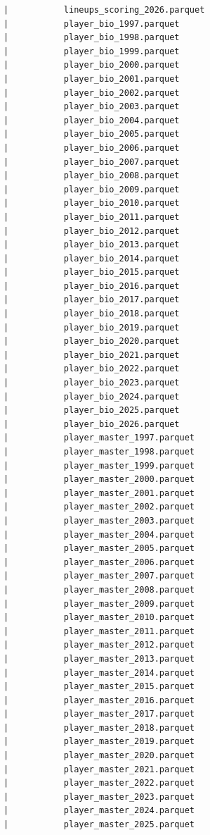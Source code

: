 \begin{lstlisting}
      |           lineups_scoring_2026.parquet
      |           player_bio_1997.parquet
      |           player_bio_1998.parquet
      |           player_bio_1999.parquet
      |           player_bio_2000.parquet
      |           player_bio_2001.parquet
      |           player_bio_2002.parquet
      |           player_bio_2003.parquet
      |           player_bio_2004.parquet
      |           player_bio_2005.parquet
      |           player_bio_2006.parquet
      |           player_bio_2007.parquet
      |           player_bio_2008.parquet
      |           player_bio_2009.parquet
      |           player_bio_2010.parquet
      |           player_bio_2011.parquet
      |           player_bio_2012.parquet
      |           player_bio_2013.parquet
      |           player_bio_2014.parquet
      |           player_bio_2015.parquet
      |           player_bio_2016.parquet
      |           player_bio_2017.parquet
      |           player_bio_2018.parquet
      |           player_bio_2019.parquet
      |           player_bio_2020.parquet
      |           player_bio_2021.parquet
      |           player_bio_2022.parquet
      |           player_bio_2023.parquet
      |           player_bio_2024.parquet
      |           player_bio_2025.parquet
      |           player_bio_2026.parquet
      |           player_master_1997.parquet
      |           player_master_1998.parquet
      |           player_master_1999.parquet
      |           player_master_2000.parquet
      |           player_master_2001.parquet
      |           player_master_2002.parquet
      |           player_master_2003.parquet
      |           player_master_2004.parquet
      |           player_master_2005.parquet
      |           player_master_2006.parquet
      |           player_master_2007.parquet
      |           player_master_2008.parquet
      |           player_master_2009.parquet
      |           player_master_2010.parquet
      |           player_master_2011.parquet
      |           player_master_2012.parquet
      |           player_master_2013.parquet
      |           player_master_2014.parquet
      |           player_master_2015.parquet
      |           player_master_2016.parquet
      |           player_master_2017.parquet
      |           player_master_2018.parquet
      |           player_master_2019.parquet
      |           player_master_2020.parquet
      |           player_master_2021.parquet
      |           player_master_2022.parquet
      |           player_master_2023.parquet
      |           player_master_2024.parquet
      |           player_master_2025.parquet

\end{lstlisting}
